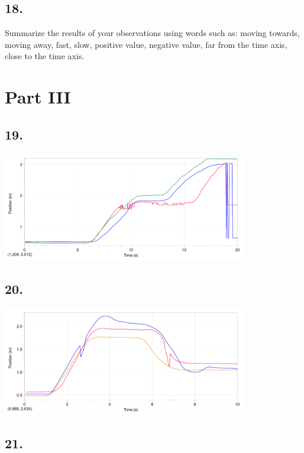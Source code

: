     \subsection*{18.}
    Summarize the results of your observations using words such as: moving towards, moving away, fast, slow, positive value, negative value, far from the time axis, close to the time axis.

    \section*{Part III}

    \subsection*{19.}

    \begin{mdframed}
        \centering\includegraphics[width=0.8\textwidth]{image7.png}
    \end{mdframed}

    \subsection*{20.}

    \begin{mdframed}
        \centering\includegraphics[width=0.8\textwidth]{image28.png}
    \end{mdframed}
    
    \subsection*{21.}

